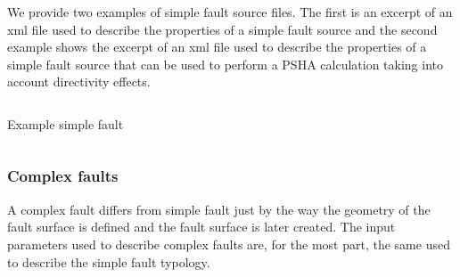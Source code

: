 We provide two examples of simple fault source files. The first is an
excerpt of an xml file used to describe the properties of a simple fault
source and the second example shows the excerpt of an xml file used to
describe the properties of a simple fault source that can be used to perform a PSHA calculation taking into account directivity effects.

\begin{listing}[htbp]
  \inputminted[firstline=1,firstnumber=1,fontsize=\footnotesize,frame=single,linenos,bgcolor=lightgray]{xml}{oqum/hazard/verbatim/input_simple_fault.xml}
  \caption{Example simple fault}
  \label{lst:example_simple_fault}
\end{listing}
%


\inputminted[firstline=1,firstnumber=1,fontsize=\footnotesize,frame=single,linenos,bgcolor=lightgray]{xml}{oqum/hazard/verbatim/input_simple_fault_directivity.xml}


%




\subsubsection{Complex faults}
\label{desc_complex_fault}

A complex fault differs from simple fault just by the way the geometry of the
fault surface is defined and the fault surface is later created. The input
parameters used to describe complex faults are, for the most part, the same
used to describe the simple fault typology.

